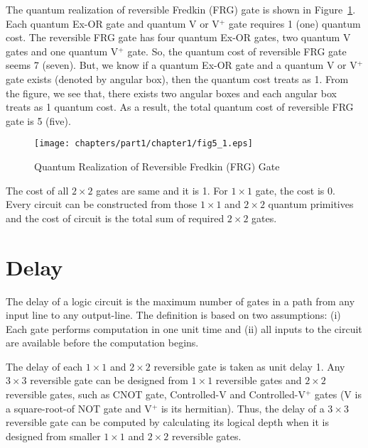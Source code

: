 \begin{example}\textnormal{
The quantum realization of reversible Fredkin (FRG) gate is shown in Figure~\ref{fig:p1_c1_fig5_1}. Each quantum Ex-OR gate and quantum V or V$^+$ gate requires 1 (one) quantum cost. The reversible FRG gate has four quantum Ex-OR gates, two quantum V gates and one quantum V$^+$ gate. So, the quantum cost of reversible FRG gate seems 7 (seven). But, we know if a quantum Ex-OR gate and a quantum V or V$^+$ gate exists  (denoted by angular box), then the quantum cost treats as 1. From the figure, we see that, there exists two angular boxes and each angular box treats as 1 quantum cost. As a result, the total quantum cost of reversible FRG gate is 5 (five).}
\end{example}

\begin{figure}[H]
\centering
\texttt{[image: chapters/part1/chapter1/fig5\_1.eps]}
\caption{Quantum Realization of Reversible Fredkin (FRG) Gate}
\label{fig:p1_c1_fig5_1}
\end{figure}
\begin{example}\textnormal{
The cost of all $2 \times 2$ gates are same and it is 1. For $1 \times 1$ gate, the cost is 0. Every circuit can be constructed from those $1 \times 1$ and $2 \times 2$ quantum primitives and the cost of circuit is the total sum of required $2 \times 2$ gates.}
\end{example}
\section{Delay}
The delay of a logic circuit is the maximum number of gates in a path from any input line to any output-line. The definition is based on two assumptions: (i) Each gate performs computation in one unit time and (ii) all inputs to the circuit are available before the computation begins.


\begin{example}\textnormal{
The delay of each $1 \times 1$ and $2 \times 2$ reversible gate is taken as unit delay 1. Any $3 \times 3$ reversible gate can be designed from $1 \times 1$ reversible gates and $2\times 2$ reversible gates, such as CNOT gate, Controlled-V and Controlled-V$^+$ gates (V is a square-root-of NOT gate and V$^+$ is its hermitian). Thus, the delay of a $3 \times 3$ reversible gate can be computed by calculating its logical depth when it is designed from smaller $1 \times 1$ and $2 \times 2$ reversible gates.}
\end{example}


